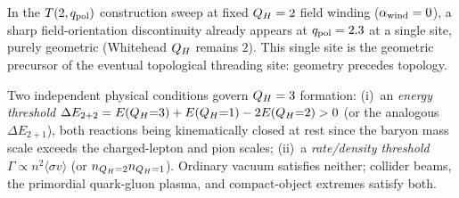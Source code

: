 \begin{observation}[Geometric precursor at $q=2.3$]
\label{P18:obs:precursor}
In the $T(2,q_{\rm pol})$ construction sweep at fixed $Q_H=2$ field
winding ($\alpha_{\rm wind}=0$), a sharp field-orientation
discontinuity already appears at $q_{\rm pol}=2.3$ at a single site,
purely geometric (Whitehead $Q_H$ remains $2$). This single site is
the geometric precursor of the eventual topological threading site:
geometry precedes topology.
\end{observation}

\begin{remark}
\label{P18:rem:production_conditions}
Two independent physical conditions govern $Q_H=3$ formation:
(i)~an \emph{energy threshold}
$\Delta E_{2+2}=E(Q_H{=}3)+E(Q_H{=}1)-2E(Q_H{=}2)>0$ (or the
analogous $\Delta E_{2+1}$), both reactions being kinematically
closed at rest since the baryon mass scale exceeds the
charged-lepton and pion scales; (ii)~a \emph{rate/density threshold}
$\Gamma\propto n^2\langle\sigma v\rangle$ (or $n_{Q_H=2}n_{Q_H=1}$).
Ordinary vacuum satisfies neither; collider beams, the primordial
quark-gluon plasma, and compact-object extremes satisfy both.
\end{remark}

